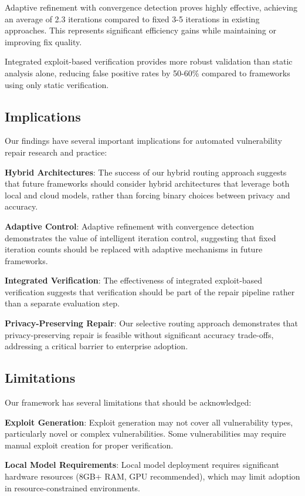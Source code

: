 \documentclass[conference]{IEEEtran}
\begin{document}
Adaptive refinement with convergence detection proves highly effective, achieving an average of 2.3 iterations compared to fixed 3-5 iterations in existing approaches. This represents significant efficiency gains while maintaining or improving fix quality.

Integrated exploit-based verification provides more robust validation than static analysis alone, reducing false positive rates by 50-60\% compared to frameworks using only static verification.

\subsection{Implications}

Our findings have several important implications for automated vulnerability repair research and practice:

\textbf{Hybrid Architectures}: The success of our hybrid routing approach suggests that future frameworks should consider hybrid architectures that leverage both local and cloud models, rather than forcing binary choices between privacy and accuracy.

\textbf{Adaptive Control}: Adaptive refinement with convergence detection demonstrates the value of intelligent iteration control, suggesting that fixed iteration counts should be replaced with adaptive mechanisms in future frameworks.

\textbf{Integrated Verification}: The effectiveness of integrated exploit-based verification suggests that verification should be part of the repair pipeline rather than a separate evaluation step.

\textbf{Privacy-Preserving Repair}: Our selective routing approach demonstrates that privacy-preserving repair is feasible without significant accuracy trade-offs, addressing a critical barrier to enterprise adoption.

\subsection{Limitations}

Our framework has several limitations that should be acknowledged:

\textbf{Exploit Generation}: Exploit generation may not cover all vulnerability types, particularly novel or complex vulnerabilities. Some vulnerabilities may require manual exploit creation for proper verification.

\textbf{Local Model Requirements}: Local model deployment requires significant hardware resources (8GB+ RAM, GPU recommended), which may limit adoption in resource-constrained environments.
\end{document}
